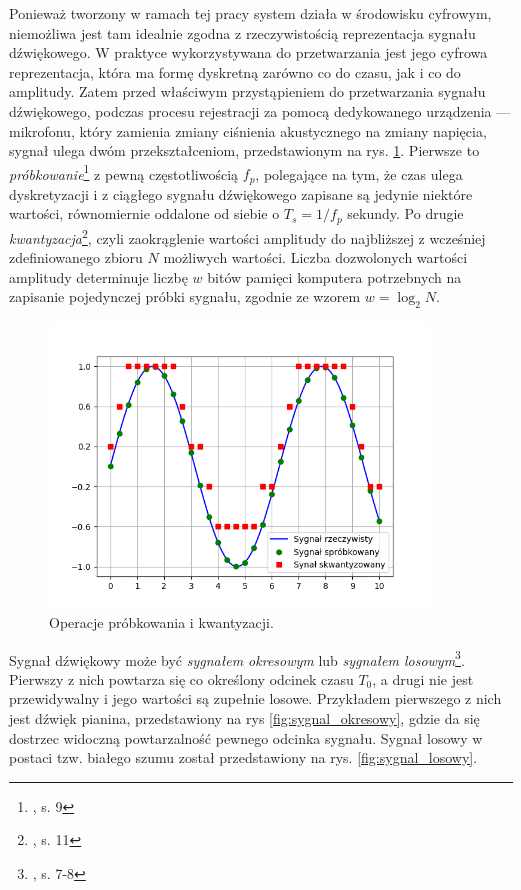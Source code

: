 Ponieważ tworzony w ramach tej pracy system działa w środowisku cyfrowym, niemożliwa jest tam idealnie zgodna z rzeczywistością reprezentacja sygnału dźwiękowego. W praktyce wykorzystywana do przetwarzania jest jego cyfrowa reprezentacja, która ma formę dyskretną zarówno co do czasu, jak i co do amplitudy. Zatem przed właściwym przystąpieniem do przetwarzania sygnału dźwiękowego, podczas procesu rejestracji za pomocą dedykowanego urządzenia --- mikrofonu, który zamienia zmiany ciśnienia akustycznego na zmiany napięcia, sygnał ulega dwóm przekształceniom, przedstawionym na rys.  \ref{fig:probkowanie_i_kwantyzacja}. Pierwsze to \emph{próbkowanie}\footnote{\cite{lerch_introduction_2012}, s. 9} z pewną częstotliwością $f_p$, polegające na tym, że czas ulega dyskretyzacji i z ciągłego sygnału dźwiękowego zapisane są jedynie niektóre wartości, równomiernie oddalone od siebie o $T_s=1/f_p$ sekundy. Po drugie \emph{kwantyzacja}\footnote{\cite{lerch_introduction_2012}, s. 11}, czyli zaokrąglenie wartości amplitudy do najbliższej z wcześniej zdefiniowanego zbioru $N$ możliwych wartości. Liczba dozwolonych wartości amplitudy determinuje liczbę $w$ bitów pamięci komputera potrzebnych na zapisanie pojedynczej próbki sygnału, zgodnie ze wzorem $w=\log_{2}N$.

\begin{figure}[htb]
    \centering
    \includegraphics[width=0.9\textwidth]{images/probkowanie_i_kwantyzacja}
    \caption{Operacje próbkowania i kwantyzacji.}
    \label{fig:probkowanie_i_kwantyzacja}
\end{figure}

Sygnał dźwiękowy może być \emph{sygnałem okresowym} lub \emph{sygnałem losowym}\footnote{\cite{lerch_introduction_2012}, s. 7-8}. Pierwszy z nich powtarza się co określony odcinek czasu $T_0$, a drugi nie jest przewidywalny i jego wartości są zupełnie losowe. Przykładem pierwszego z nich jest dźwięk pianina, przedstawiony na rys \ref{fig:sygnal_okresowy}, gdzie da się dostrzec widoczną powtarzalność pewnego odcinka sygnału.  Sygnał losowy w postaci tzw. białego szumu został przedstawiony na rys. \ref{fig:sygnal_losowy}.

